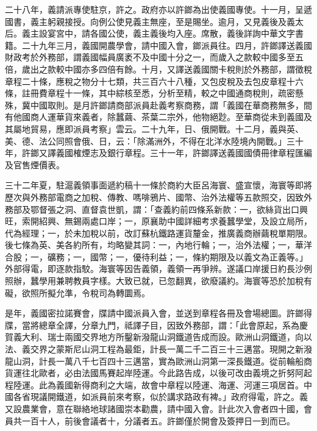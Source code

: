 \begin{pinyinscope}
二十八年，義請派專使駐京，許之。政府亦以許鎯為出使義國專使。十一月，呈遞國書，義主躬親接授。向例公使見義主無座，至是賜坐。逾月，又見義後及義太后。義主設宴宮中，請各國公使，義主義後均入座。席散，義後詳詢中華文字書籍。二十九年三月，義國開農學會，請中國入會，鎯派員往。四月，許鎯譯送義國財政考於外務部，謂義國幅員廣袤不及中國十分之一，而歲入之款較中國多至五倍，歲出之款較中國亦多四倍有餘。十月，又譯送義國關卡稅則於外務部，謂徵稅章程二十條，應稅之物分十七類，共三百六十八種，又包皮稅及去包皮章程十六條，註冊費章程十一條，其中綜核至悉，分析至精，較之中國通商稅則，疏密懸殊，冀中國取則。是月許鎯請商部派員赴義考察商務，謂「義國在華商務無多，間有他國商人運華貨來義者，除蠶繭、茶葉二宗外，他物絕尟。至華商從未到義國及其屬地貿易，應即派員考察」雲云。二十九年，日、俄開戰。十二月，義與英、美、德、法公同照會俄、日，云：「除滿洲外，不得在北洋水陸境內開戰。」三十年，許鎯又譯義國榷煙志及銀行章程。三十一年，許鎯譯送義國國債冊律章程匯編及官售煙價表。

三十二年夏，駐滬義領事面遞約稿十一條於商約大臣呂海寰、盛宣懷，海寰等即將歷次與外務部電商之加稅、傳教、嗎啡鴉片、國幣、治外法權等五款照交，因致外務部及鄂督張之洞、直督袁世凱，謂：「查義約前四條系新款：一，欲絲貨出口興旺，索開紹興、無錫兩處口岸；一，原襄助中國詳細考求養蠶學堂，及設立局所，代為經理；一，於未加稅以前，改訂蘇杭鐵路運貨釐金，推廣義商辦繭稅單期限。後七條為英、美各約所有，均略變其詞：一，內地行輪；一，治外法權；一，華洋合股；一，礦務；一，國幣；一，優待利益；一，條約期限及以義文為正義等。」外部得電，即逐款指駮。海寰等因告義領，義領一再爭辨。遂議口岸援日約長沙例照辦，蠶學用兼聘教員字樣。大致已就，已忽翻異，欲廢議約。海寰等恐於加稅有礙，欲照所擬允準，令稅司為轉圜焉。

是年，義國密拉諾賽會，牒請中國派員入會，並送到章程各冊及會場總圖。許鎯得牒，當將總章全譯，分章九門，祗譯子目，因致外務部，謂：「此會原起，系為慶賀義大利、瑞士兩國交界地方所鑿新潑龍山洞鐵道告成而設。歐洲山洞鐵道，向以法、義交界之蒙斯尼山洞工程為最鉅，計長一萬二千二百三十三邁當。現開之新潑龍山洞，計長一萬八千七百四十三邁當，實為歐洲山洞第一深長鐵道。從前輪船商貨運往北歐者，必由法國馬賽起岸陸運。今此路告成，以後可改由義境之折努阿起程陸運。此為義國新得商利之大端，故會中章程以陸運、海運、河運三項居首。中國各省現議開鐵道，如派員前來考察，似於講求路政有裨。」政府得電，許之。義又設農業會，意在聯絡地球諸國崇本勸農，請中國入會。計此次入會者四十國，會員共一百十人，前後會議者十，分議者五。許鎯僅於開會及簽押日一到而已。


\end{pinyinscope}
